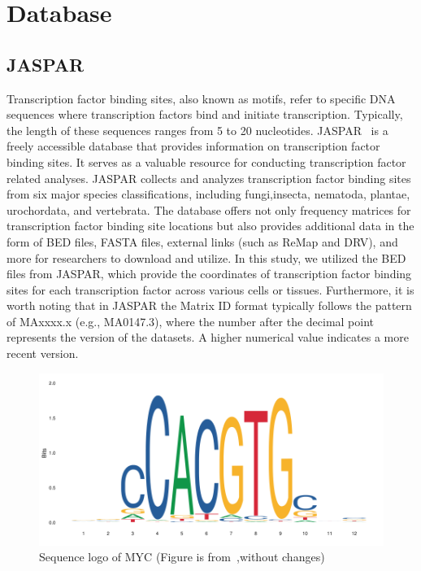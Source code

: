 \documentclass{PHlab-thesis}
\begin{document}
\section{Database}
\subsection{JASPAR}
Transcription factor binding sites, also known as motifs, refer to specific DNA sequences where transcription factors bind and initiate transcription. Typically, the length of these sequences ranges from 5 to 20 nucleotides. JASPAR~\cite{10.1093/nar/gkab1113} is a freely accessible database that provides information on transcription factor binding sites. It serves as a valuable resource for conducting transcription factor related analyses. JASPAR collects and analyzes transcription factor binding sites from six major species classifications, including fungi,insecta, nematoda, plantae, urochordata, and vertebrata. The database offers not only frequency matrices for transcription factor binding site locations but also provides additional data in the form of BED files, FASTA files, external links (such as ReMap and DRV), and more for researchers to download and utilize. In this study, we utilized the BED files from JASPAR, which provide the coordinates of transcription factor binding sites for each transcription factor across various cells or tissues. Furthermore, it is worth noting that in JASPAR the Matrix ID format typically follows the pattern of MAxxxx.x (e.g., MA0147.3), where the number after the decimal point represents the version of the datasets. A higher numerical value indicates a more recent version.

\begin{figure}[H]
	\centering
	\includegraphics[scale=0.4]{figures/MA0147.3.png}
	\caption{Sequence logo of MYC (Figure is from~\cite{10.1093/nar/gkab1113},without changes)}
	\label{fig:MA0147} %
\end{figure}
\end{document}

